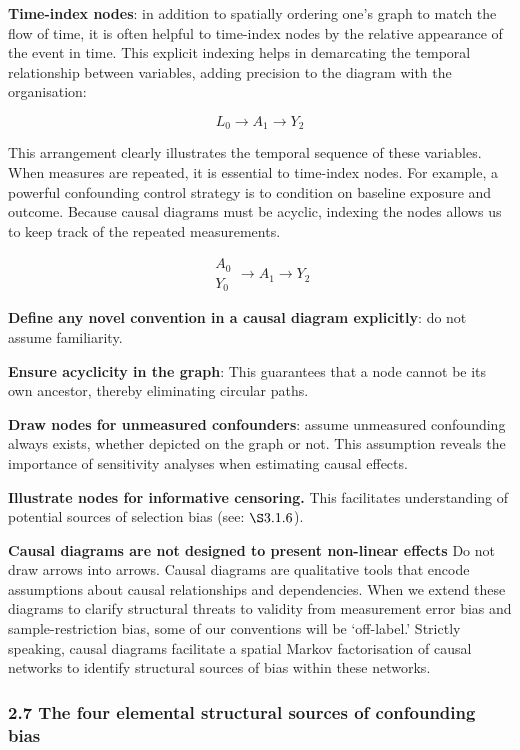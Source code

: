 \documentclass[
  singlecolumn]{article}
\begin{document}
\textbf{Time-index nodes}: in addition to spatially ordering one's graph
to match the flow of time, it is often helpful to time-index nodes by
the relative appearance of the event in time. This explicit indexing
helps in demarcating the temporal relationship between variables, adding
precision to the diagram with the organisation:

\[\boxed{L_{0}} \to A_{1} \to Y_{2}\]

This arrangement clearly illustrates the temporal sequence of these
variables. When measures are repeated, it is essential to time-index
nodes. For example, a powerful confounding control strategy is to
condition on baseline exposure and outcome. Because causal diagrams must
be acyclic, indexing the nodes allows us to keep track of the repeated
measurements.

\[
\boxed{
\begin{aligned}
A_{0} \\
Y_{0}
\end{aligned}
}
\to A_{1} \to Y_{2}
\]

\textbf{Define any novel convention in a causal diagram explicitly}: do
not assume familiarity.

\textbf{Ensure acyclicity in the graph}: This guarantees that a node
cannot be its own ancestor, thereby eliminating circular paths.

\textbf{Draw nodes for unmeasured confounders}: assume unmeasured
confounding always exists, whether depicted on the graph or not. This
assumption reveals the importance of sensitivity analyses when
estimating causal effects.

\textbf{Illustrate nodes for informative censoring.} This facilitates
understanding of potential sources of selection bias (see:
\(\S 3.1.6\)).

\textbf{Causal diagrams are not designed to present non-linear effects}
Do not draw arrows into arrows. Causal diagrams are qualitative tools
that encode assumptions about causal relationships and dependencies.
When we extend these diagrams to clarify structural threats to validity
from measurement error bias and sample-restriction bias, some of our
conventions will be `off-label.' Strictly speaking, causal diagrams
facilitate a spatial Markov factorisation of causal networks to identify
structural sources of bias within these networks.

\subsubsection{2.7 The four elemental structural sources of confounding
bias}\label{the-four-elemental-structural-sources-of-confounding-bias}
\end{document}
